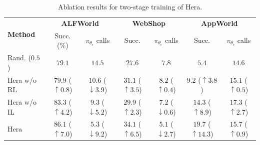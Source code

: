 \documentclass{article}
\newcommand{\name}{Hera\xspace}
\begin{document}
\begin{table}[t]
\centering
\caption{Ablation results for two-stage training of \name.}
\vspace{1mm}
\scriptsize
\renewcommand{\arraystretch}{0.95}
\begin{tabular}{l cc | cc | cc}
\toprule
\multirow{2}{*}{\textbf{Method}} 
& \multicolumn{2}{c|}{\textbf{ALFWorld}} 
& \multicolumn{2}{c|}{\textbf{WebShop}} 
& \multicolumn{2}{c}{\textbf{AppWorld}} \\
& Succ. (\%) & $\pi_{\theta_\mathrm{c}}$ calls
& Succ. & $\pi_{\theta_\mathrm{c}}$ calls 
& Succ. & $\pi_{\theta_\mathrm{c}}$ calls \\
\midrule
Rand. ($0.5$) & $79.1$
         & $14.5$  & $27.6$
         & $7.8$ & $5.4$ & $14.6$ \\
\name w/o RL & $79.9$ (\textcolor{green!50!black}{$\uparrow0.8$})  %
         & $10.6$ (\textcolor{green!50!black}{$\downarrow3.9$})  & $31.1$ (\textcolor{green!50!black}{$\uparrow3.5$})  %
         & $8.2$ (\textcolor{red!70!black}{$\uparrow0.4$})  & $9.2$ (\textcolor{green!50!black}{$\uparrow3.8$})  %
         & $15.1$ (\textcolor{red!70!black}{$\uparrow0.5$}) \\
\name w/o IL  & $83.3$ (\textcolor{green!50!black}{$\uparrow4.2$}) 
         & $9.3$ (\textcolor{green!50!black} {$\downarrow5.2$}) & $29.9$ (\textcolor{green!50!black}{$\uparrow2.3$}) 
         & $7.2$ (\textcolor{green!50!black} {$\downarrow0.6$}) & $14.3$ (\textcolor{green!50!black}{$\uparrow8.9$}) & $17.3$ (\textcolor{red!70!black}{$\uparrow2.7$}) \\
\cellcolor{blue!10}\name 
         & \cellcolor{blue!10}$86.1$ (\textcolor{green!50!black}{$\uparrow7.0$})
         & \cellcolor{blue!10}$5.3$ (\textcolor{green!50!black}{$\downarrow9.2$}) & \cellcolor{blue!10}$34.1$ (\textcolor{green!50!black}{$\uparrow6.5$})
         & \cellcolor{blue!10}$5.1$ (\textcolor{green!50!black}{$\downarrow2.7$}) & \cellcolor{blue!10}$19.7$ (\textcolor{green!50!black}{$\uparrow14.3$}) & \cellcolor{blue!10}$15.7$ (\textcolor{red!70!black}{$\uparrow0.9$}) \\
\bottomrule
\end{tabular}
\label{table:abaltion}
\vspace{-2em}
\end{table}
\end{document}
